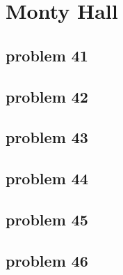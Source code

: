 \section{Monty Hall}

\subsection{problem 41}


\subsection{problem 42}


\subsection{problem 43}


\subsection{problem 44}


\subsection{problem 45}


\subsection{problem 46}
